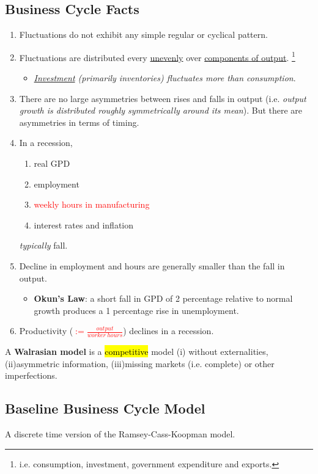 \documentclass[11pt]{article}
\begin{document}
		\subsection{Business Cycle Facts}
			\begin{enumerate}
				\item Fluctuations do not exhibit any simple regular or cyclical pattern.
				\item Fluctuations are distributed every \ul{unevenly} over \ul{components of output}. \footnote{i.e. consumption, investment, government expenditure and exports.} \begin{itemize}
						\item \emph{\ul{Investment} (primarily inventories) fluctuates more than consumption}.	
 						\end{itemize}
				\item There are no large asymmetries between rises and falls in output (i.e. \emph{output growth is distributed roughly symmetrically around its mean}). But there are asymmetries in terms of timing.
				\item In a recession,
					\begin{enumerate}
						\item real GPD
						\item employment
						\item \textcolor{red}{weekly hours in manufacturing}
						\item interest rates and inflation		
					\end{enumerate} \emph{typically} fall.
				\item Decline in employment and hours are generally smaller than the fall in output.
					\begin{itemize}
						\item \textbf{Okun's Law}: a short fall in GPD of 2 percentage relative to normal growth produces a 1 percentage rise in unemployment.
					\end{itemize}
				\item Productivity (\textcolor{red}{$:=\frac{output}{worker\ hours}$}) declines in a recession.
			\end{enumerate}
			
			\begin{definition}
				A \textbf{Walrasian model} is a \hl{competitive} model (i) without externalities, (ii)asymmetric information, (iii)missing markets (i.e. complete) or other imperfections.
			\end{definition}
		\subsection{Baseline Business Cycle Model}
			\par A discrete time version of the Ramsey-Cass-Koopman model.
\end{document}
